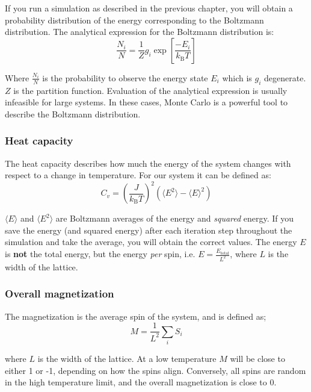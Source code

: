 \documentclass{article}
\begin{document}
If you run a simulation as described in the previous chapter, you will obtain a probability distribution of the energy corresponding to the Boltzmann distribution.
The analytical expression for the Boltzmann distribution is:
\begin{equation}
\frac{N_i}{N} = \frac{1}{Z} g_i \exp \left[ \frac{-E_i}{k_{\mathrm{B}}T} \right]
\end{equation}

Where $\frac{N_i}{N}$ is the probability to observe the energy state $E_i$ which is $g_i$ degenerate.
$Z$ is the partition function.
Evaluation of the analytical expression is usually infeasible for large systems.
In these cases, Monte Carlo is a powerful tool to describe the Boltzmann distribution.

\subsubsection{Heat capacity}

The heat capacity describes how much the energy of the system changes with respect to a change in temperature.
For our system it can be defined as:
\begin{equation}
C_v = \left( \frac{J}{k_{\mathrm{B}}T} \right)^2 \left( \langle E^2 \rangle - \langle E \rangle^2 \right)
\end{equation}

$\langle E \rangle$ and $\langle E^2 \rangle$ are Boltzmann averages of the energy and \textit{squared} energy.
If you save the energy (and squared energy) after each iteration step throughout the simulation and take the average, you will obtain the correct values.
The energy $E$ is \textbf{not} the total energy, but the energy \textit{per} spin, i.e. $E = \frac{E_\mathrm{total}}{L^2}$,
where $L$ is the width of the lattice.

\subsubsection{Overall magnetization}

The magnetization is the average spin of the system, and is defined as;
\begin{equation}
M =\frac{1}{L^2} \sum_i S_i
\end{equation}

where $L$ is the width of the lattice.
At a low temperature $M$ will be close to either 1 or -1, depending on how the spins align.
Conversely, all spins are random in the high temperature limit, and the overall magnetization is close to 0.
\end{document}

